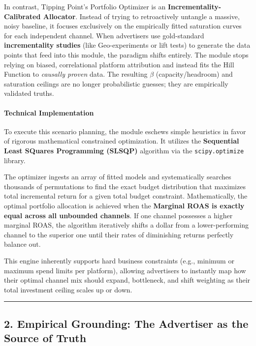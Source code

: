 \documentclass[
]{article}
\begin{document}
In contrast, Tipping Point's Portfolio Optimizer is an
\textbf{Incrementality-Calibrated Allocator}. Instead of trying to
retroactively untangle a massive, noisy baseline, it focuses exclusively
on the empirically fitted saturation curves for each independent
channel. When advertisers use gold-standard \textbf{incrementality
studies} (like Geo-experiments or lift tests) to generate the data
points that feed into this module, the paradigm shifts entirely. The
module stops relying on biased, correlational platform attribution and
instead fits the Hill Function to \emph{causally proven} data. The
resulting \(\beta\) (capacity/headroom) and saturation ceilings are no
longer probabilistic guesses; they are empirically validated truths.

\paragraph{Technical Implementation}\label{technical-implementation}

To execute this scenario planning, the module eschews simple heuristics
in favor of rigorous mathematical constrained optimization. It utilizes
the \textbf{Sequential Least SQuares Programming (SLSQP)} algorithm via
the \texttt{scipy.optimize} library.

The optimizer ingests an array of fitted models and systematically
searches thousands of permutations to find the exact budget distribution
that maximizes total incremental return for a given total budget
constraint. Mathematically, the optimal portfolio allocation is achieved
when the \textbf{Marginal ROAS is exactly equal across all unbounded
channels}. If one channel possesses a higher marginal ROAS, the
algorithm iteratively shifts a dollar from a lower-performing channel to
the superior one until their rates of diminishing returns perfectly
balance out.

This engine inherently supports hard business constraints (e.g., minimum
or maximum spend limits per platform), allowing advertisers to instantly
map how their optimal channel mix should expand, bottleneck, and shift
weighting as their total investment ceiling scales up or down.

\begin{center}\rule{0.5\linewidth}{0.5pt}\end{center}

\subsection{2. Empirical Grounding: The Advertiser as the Source of
Truth}\label{empirical-grounding-the-advertiser-as-the-source-of-truth}
\end{document}
